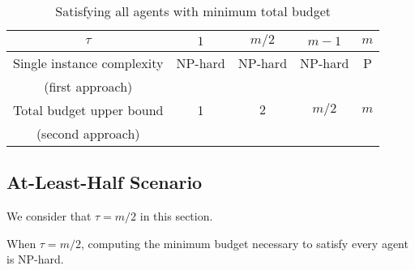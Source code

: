 \documentclass{article}
\begin{document}
\begin{table}
\begin{center}
\begin{tabular}{c|cccc}
$\tau$&$1$&$m/2$&$m-1$&$m$\\
\hline
\small{Single instance complexity}&NP-hard&NP-hard&NP-hard&P\\
\small{(first approach)} & & & & \\
\hline
\small{Total budget upper bound}&1&$2$&$m/2$& $m$\\
\small{(second approach)}&&&&\\
\end{tabular}
\caption{\label{tab_total_budget} Satisfying all agents with minimum total budget}

\end{center}
\end{table}


\subsection{At-Least-Half Scenario}

We consider that $\tau=m/2$ in this section. 

\begin{comment}
Results:

\begin{enumerate}

\item Computing the minimum budget needed to satisfy every agent is NP-hard.

\item There exists a simple algorithm which satisfies all agents in all
possible instances using a budget of $2$.

\item There exists an infinite family of instances where satisfying all agents
requires a budget of $2-o(1)$ (that is, the previous statement is tight).

\end{enumerate}

\end{comment}

\begin{theorem} When $\tau=m/2$, computing the minimum budget necessary to satisfy every agent
is NP-hard. \end{theorem}
\end{document}
